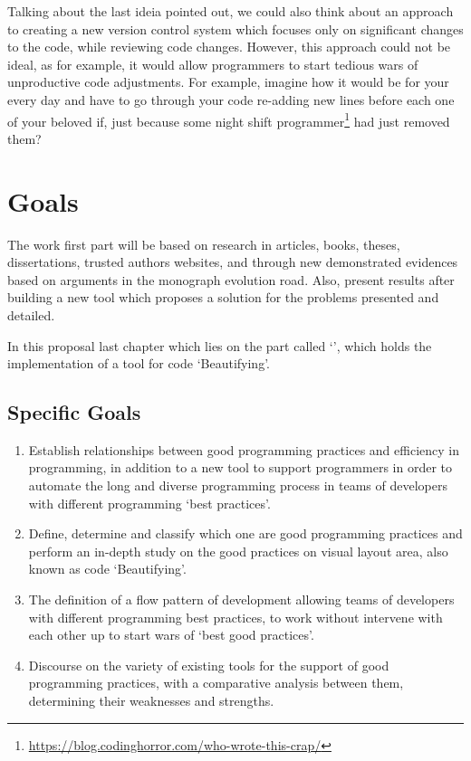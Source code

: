     Talking about the last ideia pointed out, we could also think about an
    approach to creating a new version control system which focuses only on
    significant changes to the code, while reviewing code changes. However, this
    approach could not be ideal, as for example, it would allow programmers to
    start tedious wars of unproductive code adjustments. For example, imagine
    how it would be for your every day and have to go through your code
    re-adding new lines before each one of your beloved if\s, just because some
    night shift programmer\footnote{\url{https://blog.codinghorror.com/who-wrote-this-crap/}}
    had just removed them?



    \section{Goals}

    The work first part will be based on research in
    articles, books, theses, dissertations, trusted authors websites,
    and through new demonstrated evidences based on arguments
    in the monograph evolution road.
    Also, present results after building a new tool
    which proposes a solution for the problems presented and detailed.

    In this proposal last chapter which lies on the part
    called `', which holds the implementation of a
    tool for code `Beautifying'.


    \subsection{Specific Goals}

    \begin{enumerate}

        \item Establish relationships between good programming practices and efficiency in
        programming, in addition to a new tool to support programmers in order to
        automate the long and diverse programming process in teams of developers
        with different programming `best practices'.

        \item Define, determine and classify which one are good programming
        practices and perform an in-depth study on the good practices on visual
        layout area, also known as code `Beautifying'.

        \item The definition of a flow pattern of development allowing teams of
        developers with different programming best practices, to work without
        intervene with each other up to start wars of `best good practices'.

        \item Discourse on the variety of existing tools for the support of good
        programming practices, with a comparative analysis between them,
        determining their weaknesses and strengths.

    \end{enumerate}



